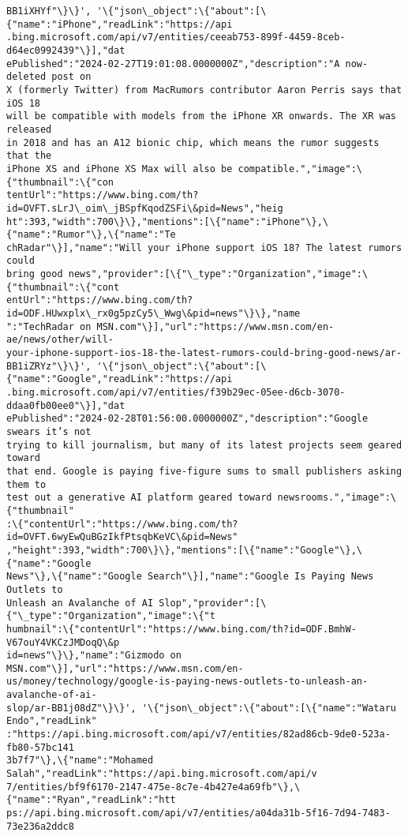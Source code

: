 \documentclass[11pt]{article}
\begin{document}
\begin{Verbatim}[commandchars=\\\{\}]
BB1iXHYf"\}\}', '\{"json\_object":\{"about":[\{"name":"iPhone","readLink":"https://api
.bing.microsoft.com/api/v7/entities/ceeab753-899f-4459-8ceb-d64ec0992439"\}],"dat
ePublished":"2024-02-27T19:01:08.0000000Z","description":"A now-deleted post on
X (formerly Twitter) from MacRumors contributor Aaron Perris says that iOS 18
will be compatible with models from the iPhone XR onwards. The XR was released
in 2018 and has an A12 bionic chip, which means the rumor suggests that the
iPhone XS and iPhone XS Max will also be compatible.","image":\{"thumbnail":\{"con
tentUrl":"https://www.bing.com/th?id=OVFT.sLrJ\_oim\_jBSpfKqodZSFi\&pid=News","heig
ht":393,"width":700\}\},"mentions":[\{"name":"iPhone"\},\{"name":"Rumor"\},\{"name":"Te
chRadar"\}],"name":"Will your iPhone support iOS 18? The latest rumors could
bring good news","provider":[\{"\_type":"Organization","image":\{"thumbnail":\{"cont
entUrl":"https://www.bing.com/th?id=ODF.HUwxplx\_rx0g5pzCy5\_Wwg\&pid=news"\}\},"name
":"TechRadar on MSN.com"\}],"url":"https://www.msn.com/en-ae/news/other/will-
your-iphone-support-ios-18-the-latest-rumors-could-bring-good-news/ar-
BB1iZRYz"\}\}', '\{"json\_object":\{"about":[\{"name":"Google","readLink":"https://api
.bing.microsoft.com/api/v7/entities/f39b29ec-05ee-d6cb-3070-ddaa0fb00ee0"\}],"dat
ePublished":"2024-02-28T01:56:00.0000000Z","description":"Google swears it’s not
trying to kill journalism, but many of its latest projects seem geared toward
that end. Google is paying five-figure sums to small publishers asking them to
test out a generative AI platform geared toward newsrooms.","image":\{"thumbnail"
:\{"contentUrl":"https://www.bing.com/th?id=OVFT.6wyEwQuBGzIkfPtsqbKeVC\&pid=News"
,"height":393,"width":700\}\},"mentions":[\{"name":"Google"\},\{"name":"Google
News"\},\{"name":"Google Search"\}],"name":"Google Is Paying News Outlets to
Unleash an Avalanche of AI Slop","provider":[\{"\_type":"Organization","image":\{"t
humbnail":\{"contentUrl":"https://www.bing.com/th?id=ODF.BmhW-V67ouY4VKCzJMDoqQ\&p
id=news"\}\},"name":"Gizmodo on MSN.com"\}],"url":"https://www.msn.com/en-
us/money/technology/google-is-paying-news-outlets-to-unleash-an-avalanche-of-ai-
slop/ar-BB1j08dZ"\}\}', '\{"json\_object":\{"about":[\{"name":"Wataru Endo","readLink"
:"https://api.bing.microsoft.com/api/v7/entities/82ad86cb-9de0-523a-fb80-57bc141
3b7f7"\},\{"name":"Mohamed Salah","readLink":"https://api.bing.microsoft.com/api/v
7/entities/bf9f6170-2147-475e-8c7e-4b427e4a69fb"\},\{"name":"Ryan","readLink":"htt
ps://api.bing.microsoft.com/api/v7/entities/a04da31b-5f16-7d94-7483-73e236a2ddc8

\end{Verbatim}
\end{document}

